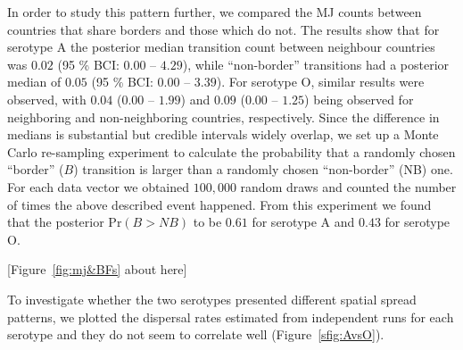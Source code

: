 \documentclass[10pt]{article}
\begin{document}

In order to study this pattern further, we compared the MJ counts between countries that share borders and those which do not.
The results show that for serotype A the posterior median transition count between neighbour countries was $0.02$ (95 \% BCI: $0.00$ -- $4.29$), while ``non-border'' transitions had a posterior median of $0.05$ (95 \% BCI: $0.00$ --  $3.39$).
For serotype O, similar results were observed, with $0.04$ ($0.00$ -- $1.99$) and $0.09$ ($0.00$ -- $1.25$) being observed for neighboring and non-neighboring countries, respectively.
Since the difference in medians is substantial but credible intervals widely overlap, we set up a Monte Carlo re-sampling experiment to calculate the probability that a randomly chosen ``border'' ($B$) transition is larger than a randomly chosen ``non-border'' (NB) one. For each data vector we obtained $100,000$ random draws and counted the number of times the above described event happened. From this experiment we found that the posterior $\mbox{Pr}(B>NB)$  to be $0.61$ for serotype A and $0.43$ for serotype O.

\begin{center}
 [Figure~\ref{fig:mj&BFs} about here]
\end{center}

To investigate whether the two serotypes presented different spatial spread patterns, we plotted the dispersal rates estimated from independent runs for each serotype and they do not seem to correlate well (Figure~\ref{sfig:AvsO}).
\end{document}
